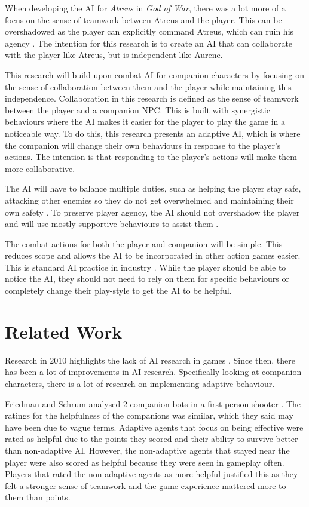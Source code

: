 \documentclass{IEEEtran}
\begin{document}
When developing the AI for \textit{Atreus} in \textit{God of War}, there was a lot more of a focus on the sense of teamwork between Atreus and the player. This can be overshadowed as the player can explicitly command Atreus, which can ruin his agency \cite{EGXCharacterDeathGuildWars}. The intention for this research is to create an AI that can collaborate with the player like Atreus, but is independent like Aurene.

This research will build upon combat AI for companion characters by focusing on the sense of collaboration between them and the player while maintaining this independence. Collaboration in this research is defined as the sense of teamwork between the player and a companion NPC. This is built with synergistic behaviours where the AI makes it easier for the player to play the game in a noticeable way. To do this, this research presents an adaptive AI, which is where the companion will change their own behaviours in response to the player's actions. The intention is that responding to the player's actions will make them more collaborative.

The AI will have to balance multiple duties, such as helping the player stay safe, attacking other enemies so they do not get overwhelmed and maintaining their own safety \cite{CoupledEmpowermentMaximisation, tremblay2013adaptive}. To preserve player agency, the AI should not overshadow the player and will use mostly supportive behaviours to assist them \cite{DesignDocAIAllies}.

The combat actions for both the player and companion will be simple. This reduces scope and allows the AI to be incorporated in other action games easier. This is standard AI practice in industry \cite{GMTGoodAI, GDCLessIsMore, GDCSimplestAITrick}. While the player should be able to notice the AI, they should not need to rely on them for specific behaviours or completely change their play-style to get the AI to be helpful.

\section{Related Work}
\label{RelatedWork}

Research in 2010 highlights the lack of AI research in games \cite{RealTimeAICritique2010}. Since then, there has been a lot of improvements in AI research. Specifically looking at companion characters, there is a lot of research on implementing adaptive behaviour.

Friedman and Schrum analysed 2 companion bots in a first person shooter \cite{CompanionBotsFPS2019}. The ratings for the helpfulness of the companions was similar, which they said may have been due to vague terms. Adaptive agents that focus on being effective were rated as helpful due to the points they scored and their ability to survive better than non-adaptive AI. However, the non-adaptive agents that stayed near the player were also scored as helpful because they were seen in gameplay often. Players that rated the non-adaptive agents as more helpful justified this as they felt a stronger sense of teamwork and the game experience mattered more to them than points.
\end{document}
